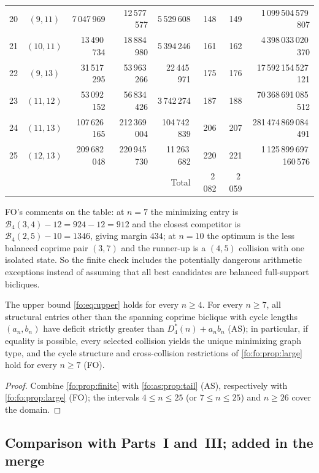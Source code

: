 \documentclass[11pt,a4paper]{article}
\numberwithin{equation}{section}
\theoremstyle{definition}
\theoremstyle{remark}
\newcommand{\Bip}{\mathcal B}
\begin{document}
{\begin{longtable}{@{}rcrrrrrr@{}}
20 & $(9,11)$ & 7\,047\,969 & 12\,577\,577 & 5\,529\,608 & 148 & 149 & 1\,099\,504\,579\,807\\
21 & $(10,11)$ & 13\,490\,734 & 18\,884\,980 & 5\,394\,246 & 161 & 162 & 4\,398\,033\,020\,370\\
22 & $(9,13)$ & 31\,517\,295 & 53\,963\,266 & 22\,445\,971 & 175 & 176 & 17\,592\,154\,527\,121\\
23 & $(11,12)$ & 53\,092\,152 & 56\,834\,426 & 3\,742\,274 & 187 & 188 & 70\,368\,691\,085\,512\\
24 & $(11,13)$ & 107\,626\,165 & 212\,369\,004 & 104\,742\,839 & 206 & 207 & 281\,474\,869\,084\,491\\
25 & $(12,13)$ & 209\,682\,048 & 220\,945\,730 & 11\,263\,682 & 220 & 221 & 1\,125\,899\,697\,160\,576\\
\midrule
\multicolumn{5}{r}{Total} & 2\,082 & 2\,059 & \\
\end{longtable}}

FO's comments on the table: at $n=7$ the minimizing entry is
$\Bip_4(3,4)-12=924-12=912$ and the closest competitor is
$\Bip_4(2,5)-10=1346$, giving margin $434$; at $n=10$ the optimum is the less
balanced coprime pair $(3,7)$ and the runner-up is a $(4,5)$ collision with
one isolated state. So the finite check includes the potentially dangerous
arithmetic exceptions instead of assuming that all best candidates are
balanced full-support bicliques.

\begin{corollary}\label{fo:cor:universal}
The upper bound \eqref{fo:eq:upper} holds for every $n\ge4$. For every $n\ge7$,
all structural entries other than the spanning coprime biclique with cycle
lengths $(a_n,b_n)$ have deficit strictly greater than $D^*_4(n)+a_nb_n$
\textup{(AS)}; in particular, if equality is possible, every selected
collision yields the unique minimizing graph type, and the cycle structure and
cross-collision restrictions of \cref{fo:fo:prop:large} hold for every $n\ge7$
\textup{(FO)}.
\end{corollary}

\begin{proof}
Combine \cref{fo:prop:finite} with \cref{fo:as:prop:tail} (AS), respectively
with \cref{fo:fo:prop:large} (FO); the intervals $4\le n\le25$ (or
$7\le n\le25$) and $n\ge26$ cover the domain.
\end{proof}

\subsection{Comparison with Parts~I and~III; added in the merge}\label{fo:sec:rowcheck}
\end{document}
